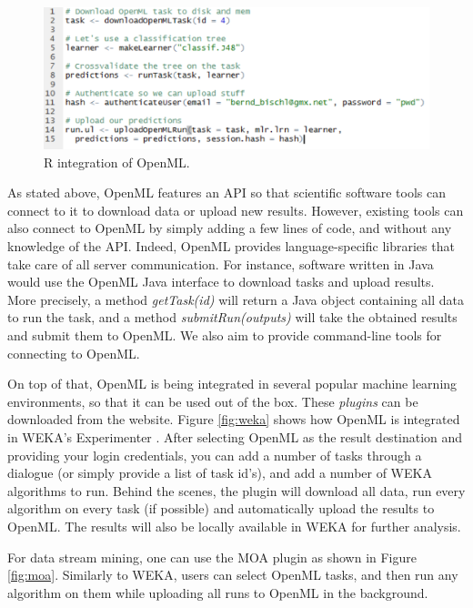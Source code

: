 \documentclass{acmproc-sp}
\begin{document}
\begin{figure}
\centering
\includegraphics[width=\columnwidth]{openml-r.png}
\caption{\label{fig:r}R integration of OpenML.}
\end{figure}

As stated above, OpenML features an API so that scientific software tools can connect to it to download data or upload new results. However, existing tools can also connect to OpenML by simply adding a few lines of code, and without any knowledge of the API. Indeed, OpenML  provides language-specific libraries that take care of all server communication. For instance, software written in Java would use the OpenML Java interface to download tasks and upload results. More precisely, a method \textit{getTask(id)} will return a Java object containing all data to run the task, and a method \textit{submitRun(outputs)} will take the obtained results and submit them to OpenML. We also aim to provide command-line tools for connecting to OpenML.

On top of that, OpenML is being integrated in several popular machine learning environments, so that it can be used out of the box. These \textit{plugins} can be downloaded from the website. Figure \ref{fig:weka} shows how OpenML is integrated in WEKA's Experimenter \cite{Hall:2009p14495}. After selecting OpenML as the result destination and providing your login credentials, you can add a number of tasks through a dialogue (or simply provide a list of task id's), and add a number of WEKA algorithms to run. Behind the scenes, the plugin will download all data, run every algorithm on every task (if possible) and automatically upload the results to OpenML. The results will also be locally available in WEKA for further analysis.

For data stream mining, one can use the MOA \cite{Bifet:2010p28524} plugin as shown in Figure \ref{fig:moa}. Similarly to WEKA, users can select OpenML tasks, and then run any algorithm on them while uploading all runs to OpenML in the background.
\end{document}
